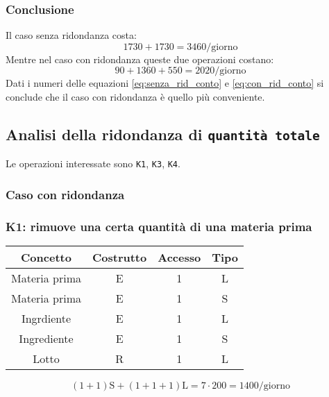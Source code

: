 \documentclass[a4paper,12pt]{report}
\begin{document}
\subsubsection{Conclusione}
Il caso senza ridondanza costa:
\begin{equation}\label{eq:senza_rid_conto}
    1730 + 1730 = 3460 \text{/giorno}
\end{equation}
Mentre nel caso con ridondanza queste due operazioni costano: 
\begin{equation}\label{eq:con_rid_conto}
    90 + 1360 + 550 = 2020 \text{/giorno}
\end{equation}
Dati i numeri delle equazioni \ref{eq:senza_rid_conto} e \ref{eq:con_rid_conto} si conclude che il caso con ridondanza è quello più conveniente.
\subsection{Analisi della ridondanza di \texttt{quantità totale}}
Le operazioni interessate sono \texttt{K1}, \texttt{K3}, \texttt{K4}.
%
\subsubsection{Caso con ridondanza}
%
\subsubsection{K1: rimuove una certa quantità di una materia prima}
%
\begin{table}[H]
    \centering
    \begin{tabular}{|| c | c | c | c ||}
        \hline
        Concetto & Costrutto & Accesso & Tipo\\
        \hline
        Materia prima & E & 1 & L\\
        \hline
        Materia prima & E & 1 & S\\
        \hline
        Ingrdiente & E & 1 & L\\
        \hline
        Ingrediente & E & 1 & S\\
        \hline
        Lotto & R & 1 & L\\
        \hline
    \end{tabular}
\end{table}
%
\begin{equation}
    (1+1)\text{S} + (1+1+1)\text{L}= 7 \cdot 200 = 1400\text{/giorno}
\end{equation}
%
\end{document}
